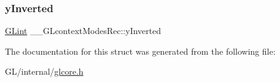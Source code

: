 \subsubsection{\texorpdfstring{y\+Inverted}{yInverted}}
{\footnotesize\ttfamily \hyperlink{gl_8h_acebcc1c5663f14ebde1d16831e5fed94}{G\+Lint} \+\_\+\+\_\+\+G\+Lcontext\+Modes\+Rec\+::y\+Inverted}



The documentation for this struct was generated from the following file\+:\begin{DoxyCompactItemize}
\item 
G\+L/internal/\hyperlink{glcore_8h}{glcore.\+h}\end{DoxyCompactItemize}
